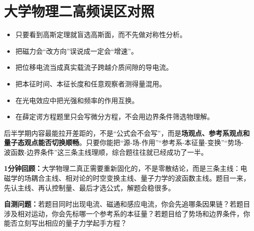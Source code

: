 \documentclass[lang=cn,11pt]{elegantbook}
\newcommand{\summaryline}[1]{\par\noindent\textbf{1分钟回顾：}#1\par}
\newcommand{\chapterselfcheck}[1]{\par\noindent\textbf{自测问题：}#1\par}
\begin{document}
\section{大学物理二高频误区对照}

\begin{itemize}
  \item 只要看到高斯定理就盲选高斯面，而不先做对称性分析。
  \item 把磁力会“改方向”误说成一定会“增速”。
  \item 把位移电流当成真实载流子跨越介质间隙的导电流。
  \item 把本征时间、本征长度和任意观察者测得量混用。
  \item 在光电效应中把光强和频率的作用互换。
  \item 在薛定谔方程题里只会写微分方程，不会用边界条件筛选物理解。
\end{itemize}

\begin{remark}
后半学期内容最能拉开差距的，不是“公式会不会写”，而是\textbf{场观点、参考系观点和量子态观点能否切换顺畅}。只要你能把“源-场-作用”“参考系-本征量-变换”“势场-波函数-边界条件”这三条主线理顺，综合题往往就已经成功了一半。
\end{remark}

\summaryline{大学物理二真正需要重新固化的，不是零散结论，而是三条主线：电磁学的场耦合主线、相对论的时空变换主线、量子力学的波函数主线。题目一来，先认主线、再认控制量、最后才选公式，解题会稳很多。}
\chapterselfcheck{若题目同时出现电流、磁通和感应电流，你会先追哪条因果链？若题目涉及相对运动，你会先标哪一个参考系的本征量？若题目给了势场和边界条件，你能否立刻写出相应的量子力学起手方程？}
\end{document}

